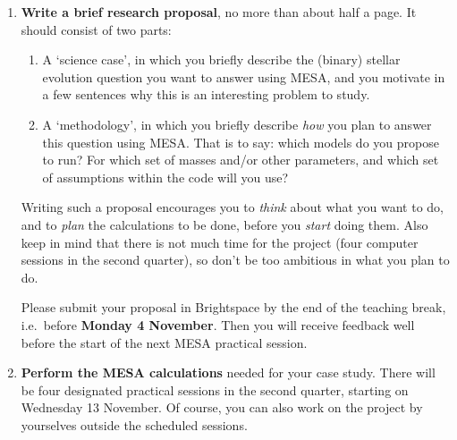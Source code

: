 \begin{enumerate}
\item \textbf{Write a brief research proposal}, no more than about half a page. It should consist of two parts:
  \begin{enumerate}
  \item A `science case', in which you briefly describe the (binary) stellar evolution question you want to answer using MESA, and you motivate in a few sentences why this is an interesting problem to study.
  \item A `methodology', in which you briefly describe \emph{how} you plan to answer this question using MESA. That is to say: which models do you propose to run? For which set of masses and/or other parameters, and which set of assumptions within the code will you use?
  \end{enumerate}
Writing such a proposal encourages you to \emph{think} about what you want to do, and to \emph{plan} the calculations to be done, before you \emph{start} doing them. Also keep in mind that there is not much time for the project (four computer sessions in the second quarter), so don't be too ambitious in what you plan to do.

Please submit your proposal in Brightspace by the end of the teaching break, i.e.\ before \textbf{Monday 4 November}. Then you will receive feedback well before the start of the next MESA practical session.

\item \textbf{Perform the MESA calculations} needed for your case study. There will be four designated practical sessions in the second quarter, starting on Wednesday 13 November. Of course, you can also work on the project by yourselves outside the scheduled sessions.


\end{enumerate}
